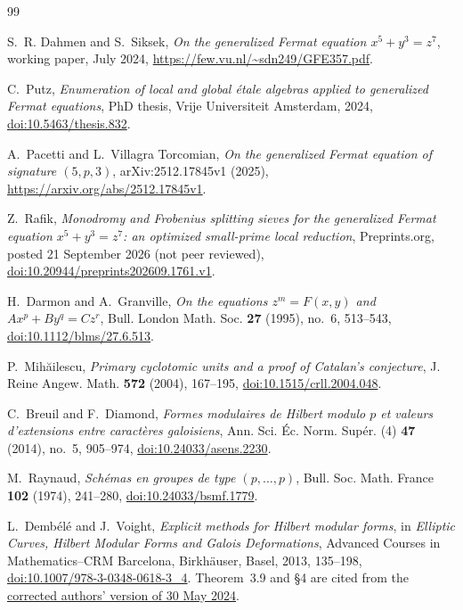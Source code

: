 \documentclass[11pt]{article}
\theoremstyle{definition}
\theoremstyle{remark}
\begin{document}
\small
\begin{thebibliography}{99}

S.~R. Dahmen and S.~Siksek,
\emph{On the generalized Fermat equation $x^5+y^3=z^7$},
working paper, July 2024,
\url{https://few.vu.nl/~sdn249/GFE357.pdf}.

C.~Putz,
\emph{Enumeration of local and global \'etale algebras applied to generalized
Fermat equations}, PhD thesis, Vrije Universiteit Amsterdam, 2024,
\href{https://doi.org/10.5463/thesis.832}{doi:10.5463/thesis.832}.

A.~Pacetti and L.~Villagra Torcomian,
\emph{On the generalized Fermat equation of signature $(5,p,3)$},
arXiv:2512.17845v1 (2025),
\url{https://arxiv.org/abs/2512.17845v1}.

Z.~Rafik,
\emph{Monodromy and Frobenius splitting sieves for the generalized Fermat
equation $x^5+y^3=z^7$: an optimized small-prime local reduction},
Preprints.org, posted 21 September 2026 (not peer reviewed),
\href{https://doi.org/10.20944/preprints202609.1761.v1}{doi:10.20944/preprints202609.1761.v1}.

H.~Darmon and A.~Granville,
\emph{On the equations $z^m=F(x,y)$ and $Ax^p+By^q=Cz^r$},
Bull. London Math. Soc. \textbf{27} (1995), no.~6, 513--543,
\href{https://doi.org/10.1112/blms/27.6.513}{doi:10.1112/blms/27.6.513}.

P.~Mih\u{a}ilescu,
\emph{Primary cyclotomic units and a proof of Catalan's conjecture},
J. Reine Angew. Math. \textbf{572} (2004), 167--195,
\href{https://doi.org/10.1515/crll.2004.048}{doi:10.1515/crll.2004.048}.

C.~Breuil and F.~Diamond,
\emph{Formes modulaires de Hilbert modulo $p$ et valeurs d'extensions entre
caract\`eres galoisiens},
Ann. Sci. \'{E}c. Norm. Sup\'{e}r. (4) \textbf{47} (2014), no.~5, 905--974,
\href{https://doi.org/10.24033/asens.2230}{doi:10.24033/asens.2230}.

M.~Raynaud,
\emph{Sch\'emas en groupes de type $(p,\ldots,p)$},
Bull. Soc. Math. France \textbf{102} (1974), 241--280,
\href{https://doi.org/10.24033/bsmf.1779}{doi:10.24033/bsmf.1779}.

L.~Demb\'el\'e and J.~Voight,
\emph{Explicit methods for Hilbert modular forms},
in \emph{Elliptic Curves, Hilbert Modular Forms and Galois Deformations},
Advanced Courses in Mathematics--CRM Barcelona,
Birkh\"auser, Basel, 2013, 135--198,
\href{https://doi.org/10.1007/978-3-0348-0618-3_4}
{doi:10.1007/978-3-0348-0618-3\_4}.
Theorem~3.9 and \S4 are cited from the
\href{https://jvoight.github.io/articles/hmf-crm-bcn-053024.pdf}
{corrected authors' version of 30 May 2024}.


\end{thebibliography}
\end{document}
